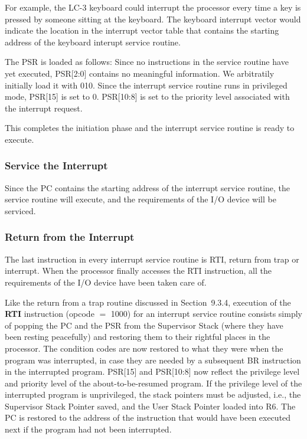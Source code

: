 \documentclass{patt}
\begin{document}
For example, the LC-3 keyboard could interrupt the processor every
time a key is pressed by someone sitting at the keyboard. The
keyboard interrupt vector would indicate the location in the interrupt
vector table that contains the starting address of the keyboard interupt
service routine.

The PSR is loaded as follows: Since no instructions in the service
routine have yet executed, PSR[2:0] contains no meaningful information.
We arbitratily initially load it with 010.
Since the interrupt service routine runs in privileged mode, PSR[15]
is set to 0.  PSR[10:8] is set to the priority level associated with
the interrupt request.

This completes the initiation phase and the interrupt service routine
is ready to execute.

\subsubsection{Service the Interrupt}

Since the PC contains the starting address of the interrupt
service routine, the service routine will execute, and the
requirements of the I/O device will be serviced.

\subsubsection{Return from the Interrupt}

The last instruction in every interrupt service routine is RTI, return
from trap or interrupt.  When the processor finally accesses the RTI
instruction, all the requirements of the I/O device have been taken
care of.

Like the return from a trap routine discussed in Section~9.3.4, 
execution of the {\bf RTI} instruction (opcode $=$ 1000) for an interrupt
service routine consists
simply of popping the PC and the PSR from the Supervisor Stack (where
they have been resting peacefully) and restoring them to their
rightful places in the processor. The condition codes are now restored
to what they were when the program was interrupted, in case they are
needed by a subsequent BR instruction in the interrupted program.  PSR[15] and
PSR[10:8] now reflect the privilege level and priority level of the
about-to-be-resumed program.  If the privilege level of the interrupted
program is unprivileged, the stack pointers must be adjusted, i.e., the 
Supervisor Stack Pointer saved, and the User Stack Pointer loaded into R6.
The PC is restored to the address of the instruction that would have 
been executed next if the program had not been interrupted.
\end{document}
